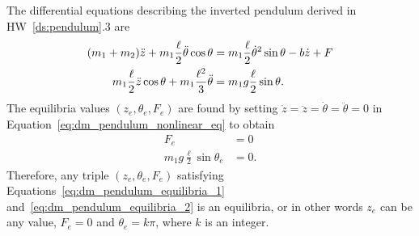 
The differential equations describing the inverted pendulum derived in HW~\ref{ds:pendulum}.3 are
\begin{align}
(m_1+m_2)\ddot{z} + m_1 \frac{\ell}{2} \ddot{\theta} \cos\theta  &=
	 m_1 \frac{\ell}{2} \dot{\theta}^2\sin\theta -b\dot{z} + F 
	 \label{eq:dm_pendulum_nonlinear_eq} \\
m_1 \frac{\ell}{2} \ddot{z} \cos\theta +  m_1 \frac{\ell^2}{3} \ddot{\theta} &=
	m_1 g \frac{\ell}{2} \sin\theta. \notag
\end{align}
The equilibria values $(z_e,\theta_e,F_e)$ are found by setting $\dot{z}=\ddot{z}=\dot{\theta}=\ddot{\theta}=0$ in Equation~\eqref{eq:dm_pendulum_nonlinear_eq} to obtain
\begin{align}
F_e &= 0 \label{eq:dm_pendulum_equilibria_1} \\ 
m_1g\frac{\ell}{2}\sin\theta_e &= 0.\label{eq:dm_pendulum_equilibria_2}
\end{align}
Therefore, any triple $(z_e, \theta_e, F_e)$ satisfying Equations~\eqref{eq:dm_pendulum_equilibria_1} and~\eqref{eq:dm_pendulum_equilibria_2} is an equilibria, or in other words $z_e$ can be any value, $F_e=0$ and $\theta_e = k\pi$, where $k$ is an integer.  

